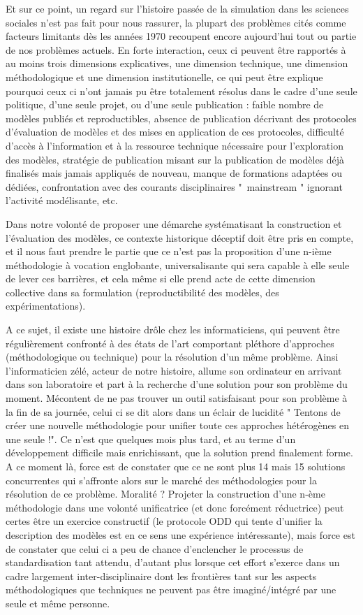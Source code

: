 Et sur ce point, un regard sur l'histoire passée de la simulation dans les sciences sociales n'est pas fait pour nous rassurer, la plupart des problèmes cités comme facteurs limitants dès les années 1970 recoupent encore aujourd'hui tout ou partie de nos problèmes actuels. En forte interaction, ceux ci peuvent être rapportés à au moins trois dimensions explicatives, une dimension technique, une dimension méthodologique et une dimension institutionelle, ce qui peut être explique pourquoi ceux ci n'ont jamais pu être totalement résolus dans le cadre d'une seule politique, d'une seule projet, ou d'une seule publication : faible nombre de modèles publiés et reproductibles, absence de publication décrivant des protocoles d'évaluation de modèles et des mises en application de ces protocoles, difficulté d'accès à l'information et à la ressource technique nécessaire pour l'exploration des modèles, stratégie de publication misant sur la publication de modèles déjà finalisés mais jamais appliqués de nouveau, manque de formations adaptées ou dédiées, confrontation avec des courants disciplinaires " mainstream " ignorant l'activité modélisante, etc.

Dans notre volonté de proposer une démarche systématisant la construction et l'évaluation des modèles, ce contexte historique déceptif doit être pris en compte, et il nous faut prendre le partie que ce n'est pas la proposition d'une n-ième méthodologie à vocation englobante, universalisante qui sera capable à elle seule de lever ces barrières, et cela même si elle prend acte de cette dimension collective dans sa formulation (reproductibilité des modèles, des expérimentations).

 A ce sujet, il existe une histoire drôle chez les informaticiens, qui peuvent être régulièrement confronté à des états de l'art comportant pléthore d'approches (méthodologique ou technique) pour la résolution d'un même problème. Ainsi l'informaticien zélé, acteur de notre histoire, allume son ordinateur en arrivant dans son laboratoire et part à la recherche d'une solution pour son problème du moment. Mécontent de ne pas trouver un outil satisfaisant pour son problème à la fin de sa journée, celui ci se dit alors dans un éclair de lucidité " Tentons de créer une nouvelle méthodologie pour unifier toute ces approches hétérogènes en une seule !". Ce n'est que quelques mois plus tard, et au terme d'un développement difficile mais enrichissant, que la solution prend finalement forme. A ce moment là, force est de constater que ce ne sont plus 14 mais 15 solutions concurrentes qui s'affronte alors sur le marché des méthodologies pour la résolution de ce problème. Moralité ? Projeter la construction d'une n-ème méthodologie dans une volonté unificatrice (et donc forcément réductrice) peut certes être un exercice constructif (le protocole ODD qui tente d'unifier la description des modèles est en ce sens une expérience intéressante), mais force est de constater que celui ci a peu de chance d'enclencher le processus de standardisation tant attendu, d'autant plus lorsque cet effort s'exerce dans un cadre largement inter-disciplinaire dont les frontières tant sur les aspects méthodologiques que techniques ne peuvent pas être imaginé/intégré par une seule et même personne.

